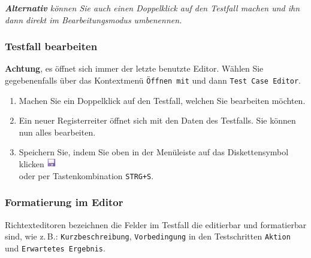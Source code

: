 \documentclass[11pt,a4paper,titlepage]{article}
\begin{document}
\textit{\textbf{Alternativ} können Sie auch einen Doppelklick auf den Testfall machen und ihn dann direkt im Bearbeitungsmodus umbenennen.}

\subsubsection{Testfall bearbeiten}
\textbf{Achtung}, es öffnet sich immer der letzte benutzte Editor. Wählen Sie gegebenenfalls über das Kontextmenü \texttt{Öffnen mit} und dann \texttt{Test Case Editor}.
\begin{enumerate}
\item Machen Sie ein Doppelklick auf den Testfall, welchen Sie bearbeiten möchten.
\item Ein neuer Registerreiter öffnet sich mit den Daten des Testfalls. Sie können nun alles bearbeiten.
\item Speichern Sie, indem Sie oben in der Menüleiste auf das
Diskettensymbol klicken
\includegraphics[width= 15px]{BilderHandbuch/Testfall/Disk.png}
\\ oder per Tastenkombination \texttt{STRG+S}.
\end{enumerate}

\subsubsection{Formatierung im Editor}
Richtexteditoren bezeichnen die Felder im Testfall die editierbar und formatierbar sind, wie z.\,B.: \texttt{Kurzbeschreibung}, \texttt{Vorbedingung} in den Testschritten \texttt{Aktion} und \texttt{Erwartetes Ergebnis}.
\end{document}
